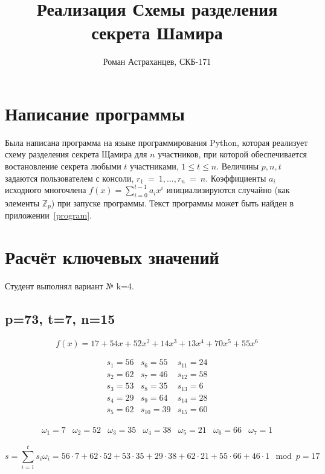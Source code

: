 \documentclass[a4paper,12pt]{article}
\title{Реализация Схемы разделения секрета Шамира}
\author{Роман Астраханцев, СКБ-171}
\begin{document}
	\maketitle
	
	\section{Написание программы}
	Была написана программа на языке программирования Python, которая реализует схему разделения секрета Щамира для $n$ участников, при которой обеспечивается востановление секрета любыми $t$ участниками, $1\le t \le n$. Величины $p, n, t$ задаются пользователем с консоли, $r_1~=~1, \dots, r_n~=~n$. Коэффициенты $a_i$ исходного многочлена $f(x) = \sum_{i=0}^{t-1} a_{i} x^i$ инициализируются случайно (как элементы $\mathbb{Z}_p$) при запуске программы. Текст программы может быть найден в приложении~\ref{program}.
	
	\section{Расчёт ключевых значений}
	
	Студент выполнял вариант № k=4.

	\subsection{p=73, t=7, n=15}
	
	\[ f(x) = 17 + 54 x + 52 x^2 + 14 x^3 + 13 x^4 + 70 x^5 + 55 x^6  \]
	
	\[
	\begin{array}{ccc}	
		
		s_1 = 56	& 		s_6 = 55	&		s_{11} = 24 \\
		s_2 = 62	&		s_7 = 46	&		s_{12} = 58 \\
		s_3 = 53	&		s_8 = 35	&		s_{13} = 6  \\
		s_4 = 29	&		s_9 = 64	&		s_{14} = 28 \\
		s_5 = 62	&		s_{10} = 39 &		s_{15} = 60 

	\end{array}		
	\]
	
	
	\[
	\begin{array}{ccccccc}	
		\omega_1 = 7 & \omega_2 = 52 & \omega_3 = 35 & \omega_4 = 38 & \omega_5 = 21 & \omega_6 = 66 & \omega_7 = 1
	\end{array}		
	\]
	
	\[
		s = \sum_{i=1}^{t} s_i \omega_i = 56\cdot 7 + 62 \cdot 52 + 53 \cdot 35 + 29 \cdot 38 + 62 \cdot 21 + 55 \cdot 66 + 46 \cdot 1 \mod p = 17
	\]
		
\end{document}
